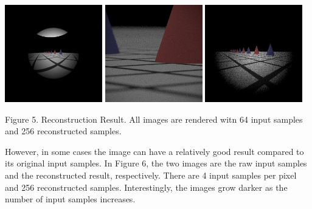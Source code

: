 \documentclass{article}
\begin{document}
\begin{center}
  \includegraphics[width=120pt,height=120pt]{./dof-dragons-fisheye-64-256-10-1-0.png}
  \includegraphics[width=120pt,height=120pt]{./dof-dragons-telephoto-64-256-10-1-0.png}
  \includegraphics[width=120pt,height=120pt]{./dof-dragons-wide-64-256-10-1-0.png}

  \small{Figure 5. Reconstruction Result. All images are rendered witn 64 input samples and 256 reconstructed samples.}
\end{center}

However, in some cases the image can have a relatively good result compared to its original input samples. In Figure 6, the two images are the raw input samples and the reconstructed result, respectively. There are 4 input samples per pixel and 256 reconstructed samples. Interestingly, the images grow darker as the number of input samples increases.
\end{document}
